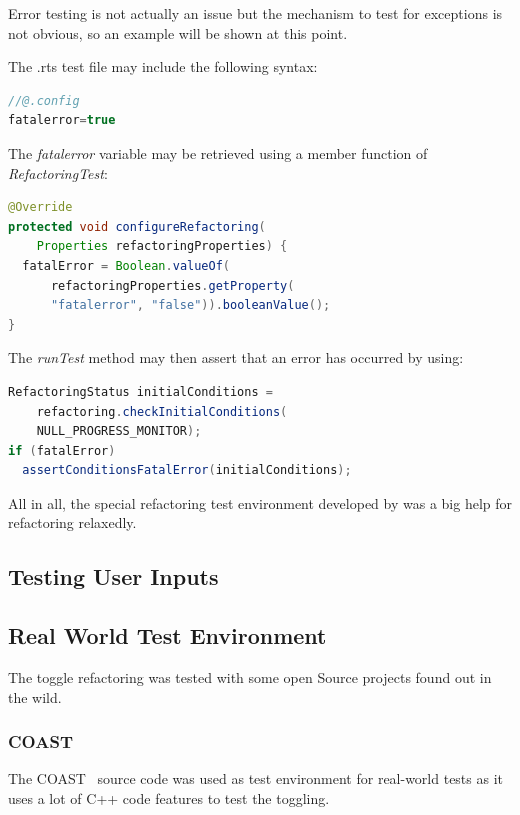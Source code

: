 Error testing is not actually an issue but the mechanism to test for exceptions 
is not obvious, so an example will be shown at this point. 

The .rts test file may include the following syntax:

\begin{lstlisting}[caption={Syntax to set variables inside a .rts file},
language=java]
//@.config
fatalerror=true
\end{lstlisting}

The \textit{fatalerror} variable may be retrieved using a member function of \textit{RefactoringTest}:
\begin{lstlisting}[caption={Accessing a property set in the .rts file},
language=java]
@Override
protected void configureRefactoring(
    Properties refactoringProperties) {
  fatalError = Boolean.valueOf(
      refactoringProperties.getProperty(
      "fatalerror", "false")).booleanValue();
}
\end{lstlisting}

The \textit{runTest} method may then assert that an error has occurred by using:
\begin{lstlisting}[caption={Checking for errors inside the refactoring test class},language=java]
RefactoringStatus initialConditions = 
    refactoring.checkInitialConditions(
    NULL_PROGRESS_MONITOR);
if (fatalError)
  assertConditionsFatalError(initialConditions);
\end{lstlisting}

All in all, the special refactoring test environment developed by \cite{GB06} 
was a big help for refactoring relaxedly.

\subsection{Testing User Inputs}


\subsection{Real World Test Environment}

The toggle refactoring was tested with some open Source projects found out in
the wild.

\subsubsection{COAST}
The COAST~\cite{COAST} source code was used as test environment for real-world 
tests as it uses a lot of C++ code features to test the toggling.

